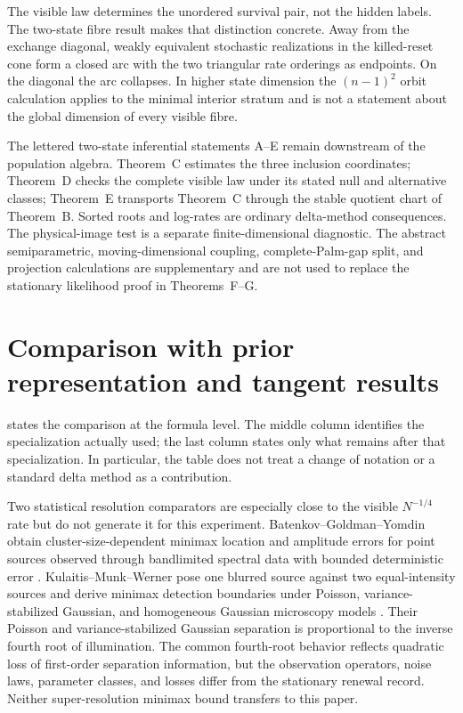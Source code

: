 The visible law determines the unordered survival pair, not the hidden labels.
The two-state fibre result makes that distinction concrete.  Away from the
exchange diagonal, weakly equivalent stochastic realizations in the
killed-reset cone form a closed arc with the two triangular rate orderings as
endpoints.  On the diagonal the arc collapses.  In higher state dimension the
\((n-1)^2\) orbit calculation applies to the minimal interior stratum and is
not a statement about the global dimension of every visible fibre.

The lettered two-state inferential statements A--E remain downstream of the
population algebra.  Theorem~C estimates the three inclusion coordinates;
Theorem~D checks the complete visible law under its stated null and alternative
classes; Theorem~E transports Theorem~C through the stable quotient chart of
Theorem~B.  Sorted roots and log-rates are ordinary delta-method consequences.
The physical-image test is a separate finite-dimensional diagnostic.  The
abstract semiparametric, moving-dimensional coupling, complete-Palm-gap split,
and projection calculations are supplementary and are not used to replace the
stationary likelihood proof in Theorems~F--G.

\section{Comparison with prior representation and tangent results}
\label{sec:theorem-led-comparison}

 states the comparison at the formula level.
The middle column identifies the specialization actually used; the last column
states only what remains after that specialization.  In particular, the table
does not treat a change of notation or a standard delta method as a
contribution.

Two statistical resolution comparators are especially close to the visible
\(N^{-1/4}\) rate but do not generate it for this experiment.
Batenkov--Goldman--Yomdin obtain cluster-size-dependent minimax location and
amplitude errors for point sources observed through bandlimited spectral data
with bounded deterministic error
\cite{BatenkovGoldmanYomdin2021SuperResolution}.  Kulaitis--Munk--Werner pose
one blurred source against two equal-intensity sources and derive minimax
detection boundaries under Poisson, variance-stabilized Gaussian, and
homogeneous Gaussian microscopy models
\cite{KulaitisMunkWerner2021Resolution}.  Their Poisson and
variance-stabilized Gaussian separation is proportional to the inverse fourth
root of illumination.  The common fourth-root behavior reflects quadratic
loss of first-order separation information, but the observation operators,
noise laws, parameter classes, and losses differ from the stationary renewal
record.  Neither super-resolution minimax bound transfers to this paper.

